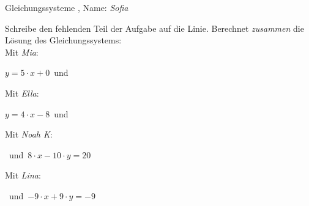 \newpage
\begin{center}\large Gleichungssysteme
, Name: \emph{Sofia}\end{center}
Schreibe den fehlenden Teil der Aufgabe auf die Linie. Berechnet \emph{zusammen} die Lösung des Gleichungssystems:
\\
\vfill Mit \emph{Mia}:
\begin{center}$y=5\cdot x+0$\mbox{ }und\mbox{ }\underline{}
\end{center}
\vfill Mit \emph{Ella}:
\begin{center}$y=4\cdot x-8$\mbox{ }und\mbox{ }\underline{}
\end{center}
\vfill Mit \emph{Noah K}:
\begin{center}\underline{}
\mbox{ }und\mbox{ }$8\cdot x-10\cdot y=20$\end{center}
\vfill Mit \emph{Lina}:
\begin{center}\underline{}
\mbox{ }und\mbox{ }$-9\cdot x+9\cdot y=-9$\end{center}
